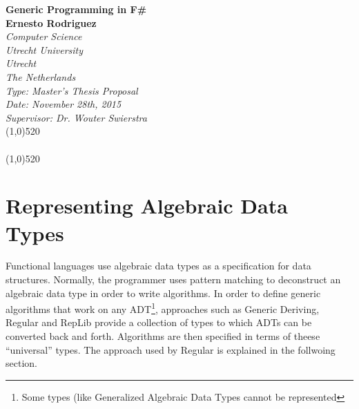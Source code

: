 \documentclass[8pt]{extarticle}
\author{Ernesto Rodriguez}
\begin{document}
\Huge{\bf Generic Programming in F\#\\[1cm]}
\large{\bf Ernesto Rodriguez\\[0.5cm]}
\emph{Computer Science \\ Utrecht University \\ Utrecht \\ The Netherlands \\[0.5cm]}
\emph{Type: Master's Thesis Proposal \\ Date: November 28th, 2015 \\ Supervisor: Dr. Wouter Swierstra\\}
\line(1,0){520}\\ \\

\line(1,0){520}
\section{Representing Algebraic Data Types}
Functional languages use algebraic data types as a specification for data structures. Normally, the programmer uses pattern matching to deconstruct an algebraic data type in order to write algorithms. In order to define generic algorithms that work on any ADT\footnote{Some types (like Generalized Algebraic Data Types\cite{GADTs} cannot be represented}, approaches such as Generic Deriving\cite{GenericDeriving}, Regular\cite{Regular} and RepLib\cite{RepLib} provide a collection of types to which ADTs can be converted back and forth. Algorithms are then specified in terms of theese ``universal'' types. The approach used by Regular is explained in the follwoing section.
\end{document}
